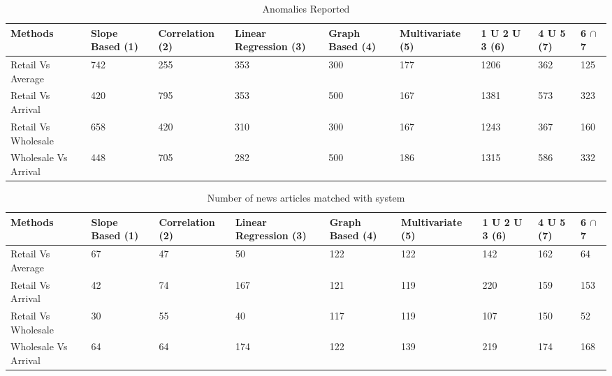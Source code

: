 \documentclass[a4paper,10pt]{report}
\begin{document}
  
	\begin{table}[]
	\centering
	
	\resizebox{\textwidth}{!}
	{\begin{tabular}{|l|l|l|l|l|l|l|l|l|}
	\hline
	Methods              & Slope Based (1) & Correlation (2) & Linear Regression (3) & Graph Based (4) & Multivariate (5) & 1 U 2 U 3 (6) & 4 U 5 (7) & 6 $\cap$ 7  \\
	\hline
	Retail Vs Average    & 742 & 255 & 353 & 300 & 177 & 1206 & 362 & 125 \\
	\hline
	Retail Vs Arrival    & 420 & 795 & 353 & 500 & 167 & 1381 & 573 & 323 \\
	\hline
	Retail Vs Wholesale  & 658 & 420 & 310 & 300 & 167 & 1243 & 367 & 160 \\
	\hline
	Wholesale Vs Arrival & 448 & 705 & 282 & 500 & 186 & 1315 & 586 & 332 \\
	\hline
	\end{tabular}}
	\caption{Anomalies Reported}
	\label{AnomaliesReported}
	\end{table}
      
	\begin{table}[]
	\centering
	
	\resizebox{\textwidth}{!}
	{\begin{tabular}{|l|l|l|l|l|l|l|l|l|}
	\hline
	Methods              & Slope Based (1) & Correlation (2) & Linear Regression (3) & Graph Based (4) & Multivariate (5) & 1 U 2 U 3 (6) & 4 U 5 (7) & 6 $\cap$ 7   \\
	\hline
	Retail Vs Average    & 67 & 47 & 50  & 122 & 122 & 142 & 162 & 64  \\
	\hline
	Retail Vs Arrival    & 42 & 74 & 167 & 121 & 119 & 220 & 159 & 153 \\
	\hline
	Retail Vs Wholesale  & 30 & 55 & 40  & 117 & 119 & 107 & 150 & 52  \\
	\hline
	Wholesale Vs Arrival & 64 & 64 & 174 & 122 & 139 & 219 & 174 & 168 \\
	\hline
	\end{tabular}}
	\caption{Number of news articles matched with system}
	\label{ArticlesMatched}
	\end{table}
	
      
\end{document}
